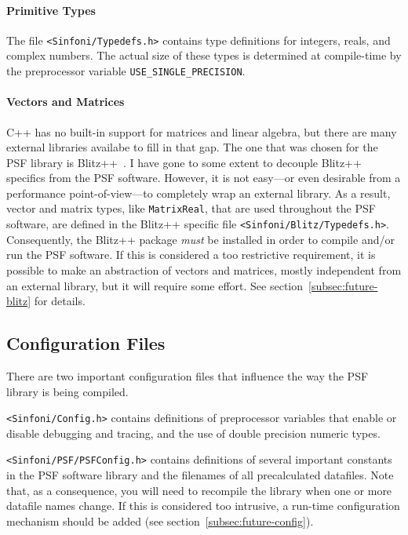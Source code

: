 \documentclass[a4paper]{article}
\begin{document}
\paragraph{Primitive Types}
The file \verb|<Sinfoni/Typedefs.h>| contains type definitions for integers,
reals, and complex numbers. The actual size of these types is determined at
compile-time by the preprocessor variable \verb|USE_SINGLE_PRECISION|.

\paragraph{Vectors and Matrices}
C++ has no built-in support for matrices and linear algebra, but there are
many external libraries availabe to fill in that gap. The one that was chosen
for the PSF library is Blitz++~\cite{blitz}. I have gone to some extent to
decouple Blitz++ specifics from the PSF software. However, it is not easy---or
even desirable from a performance point-of-view---to completely wrap an
external library. As a result, vector and matrix types, like
\verb|MatrixReal|, that are used throughout the PSF software, are defined in
the Blitz++ specific file \verb|<Sinfoni/Blitz/Typedefs.h>|. Consequently, the
Blitz++ package {\em must\/} be installed in order to compile and/or run the
PSF software. If this is considered a too restrictive requirement, it is
possible to make an abstraction of vectors and matrices, mostly independent
from an external library, but it will require some effort. See
section~\ref{subsec:future-blitz} for details.


\subsection{Configuration Files}
There are two important configuration files that influence the way the PSF
library is being compiled.

\begin{trivlist}
\item{\tt <Sinfoni/Config.h>} contains definitions of preprocessor
variables that enable or disable debugging and tracing, and the use of double
precision numeric types.
\item{\tt <Sinfoni/PSF/PSFConfig.h>} contains definitions of several
important constants in the PSF software library and the filenames of all
precalculated datafiles. Note that, as a consequence, you will need to
recompile the library when one or more datafile names change. If this is
considered too intrusive, a run-time configuration mechanism should be added
(see section~\ref{subsec:future-config}).
\end{trivlist}
\end{document}
